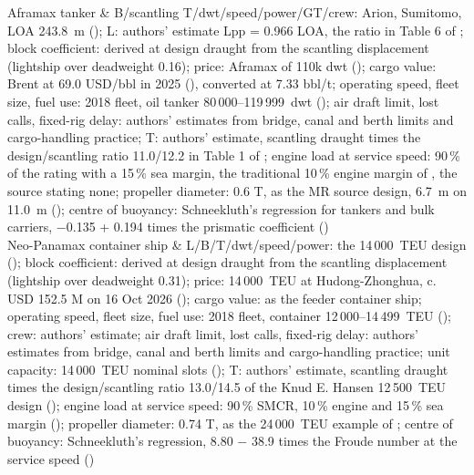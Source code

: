 Aframax tanker & B/scantling T/dwt/speed/power/GT/crew: Arion, Sumitomo, LOA 243.8~m (\citealp{baird2026arion}); L: authors' estimate Lpp = 0.966 LOA, the ratio in Table 6 of \citet{man2022bulk}; block coefficient: derived at design draught from the scantling displacement (lightship over deadweight 0.16); price: Aframax of 110k dwt (\citealp[pp. 7 and 16]{allied2026}); cargo value: Brent at 69.0 USD/bbl in 2025 (\citealp{worldbank2026}), converted at 7.33 bbl/t; operating speed, fleet size, fuel use: 2018 fleet, oil tanker 80\,000--119\,999~dwt (\citealp[Table 35]{faber2020}); air draft limit, lost calls, fixed-rig delay: authors' estimates from bridge, canal and berth limits and cargo-handling practice; T: authors' estimate, scantling draught times the design/scantling ratio 11.0/12.2 in Table 1 of \citet{man2019mr}; engine load at service speed: 90\,\% of the rating with a 15\,\% sea margin, the traditional 10\,\% engine margin of \citet{man2011}, the source stating none; propeller diameter: 0.6 T, as the MR source design, 6.7~m on 11.0~m (\citealp[Tables 1-2]{man2019mr}); centre of buoyancy: Schneekluth's regression for tankers and bulk carriers, \ensuremath{-}0.135 + 0.194 times the prismatic coefficient (\citealp[slide 16]{ventura_estimation}) \\
Neo-Panamax container ship & L/B/T/dwt/speed/power: the 14\,000~TEU design (\citealp[Table 19]{man2024container}); block coefficient: derived at design draught from the scantling displacement (lightship over deadweight 0.31); price: 14\,000~TEU at Hudong-Zhonghua, c. USD 152.5 M on 16 Oct 2026 (\citealp[p. 7]{allied2026}); cargo value: as the feeder container ship; operating speed, fleet size, fuel use: 2018 fleet, container 12\,000--14\,499~TEU (\citealp[Table 35]{faber2020}); crew: authors' estimate; air draft limit, lost calls, fixed-rig delay: authors' estimates from bridge, canal and berth limits and cargo-handling practice; unit capacity: 14\,000~TEU nominal slots (\citealp[Table 19]{man2024container}); T: authors' estimate, scantling draught times the design/scantling ratio 13.0/14.5 of the Knud E. Hansen 12\,500~TEU design (\citealp{keh_12500teu}); engine load at service speed: 90\,\% SMCR, 10\,\% engine and 15\,\% sea margin (\citealp[Table 19]{man2024container}); propeller diameter: 0.74 T, as the 24\,000~TEU example of \citet{man2011}; centre of buoyancy: Schneekluth's regression, 8.80 \ensuremath{-} 38.9 times the Froude number at the service speed (\citealp[slide 16]{ventura_estimation}) \\
